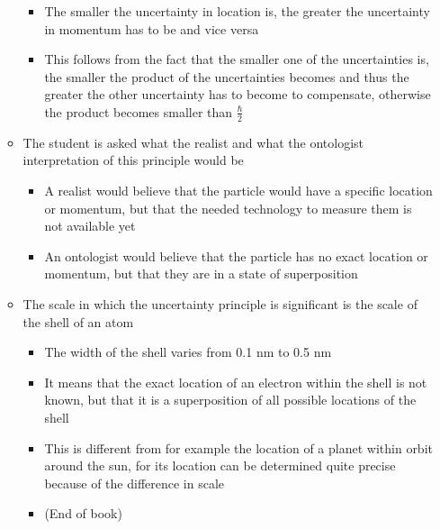 \documentclass[11pt,twoside]{report} %
\begin{document}
\begin{itemize}
\begin{itemize}
\begin{itemize}
				\item The smaller the uncertainty in location is, the greater the uncertainty in momentum has to be and vice versa
				\item This follows from the fact that the smaller one of the uncertainties is, the smaller the product of the uncertainties becomes and thus the greater the other uncertainty has to become to compensate, otherwise the product becomes smaller than $\frac{\hbar}{2}$
			\end{itemize}
			\item The student is asked what the realist and what the ontologist interpretation of this principle would be
			\begin{itemize}
				\item A realist would believe that the particle would have a specific location or momentum, but that the needed technology to measure them is not available yet
				\item An ontologist would believe that the particle has no exact location or momentum, but that they are in a state of superposition
			\end{itemize}
			\item The scale in which the uncertainty principle is significant is the scale of the shell of an atom
			\begin{itemize}
				\item The width of the shell varies from 0.1 nm to 0.5 nm
				\item It means that the exact location of an electron within the shell is not known, but that it is a superposition of all possible locations of the shell
				\item This is different from for example the location of a planet within orbit around the sun, for its location can be determined quite precise because of the difference in scale
				\item (End of book)
			\end{itemize}
		\end{itemize}
	\end{itemize}
\end{document}
